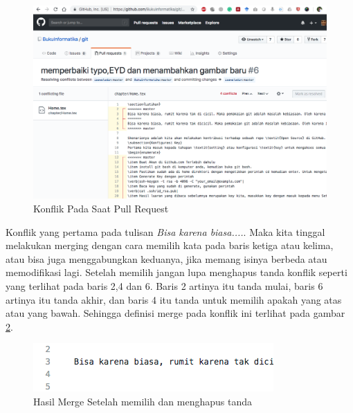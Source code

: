 \begin{figure}[!htbp]
\centerline{\includegraphics[width=.75\textwidth]{Figures/webkonflik3}}
\caption{Konflik Pada Saat Pull Request}
\label{fig:webkonflik3}
\end{figure}

Konflik yang pertama pada tulisan \textit{Bisa karena biasa....}. Maka kita tinggal melakukan merging dengan cara memilih kata pada baris ketiga atau kelima, atau bisa juga menggabungkan keduanya, jika memang isinya berbeda atau memodifikasi lagi. Setelah memilih jangan lupa menghapus tanda konflik seperti yang terlihat pada baris 2,4 dan 6. Baris 2 artinya itu tanda mulai, baris 6 artinya itu tanda akhir, dan baris 4 itu tanda untuk memilih apakah yang atas atau yang bawah. Sehingga definisi merge pada konflik ini terlihat pada gambar \ref{fig:webkonflik5}.



\begin{figure}[!htbp]
\centerline{\includegraphics[width=.75\textwidth]{Figures/webkonflik5}}
\caption{Hasil Merge Setelah memilih dan menghapus tanda}
\label{fig:webkonflik5}
\end{figure}

